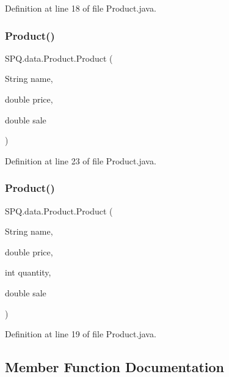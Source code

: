 Definition at line 18 of file Product.\+java.

\mbox{\label{class_s_p_q_1_1data_1_1_product_aeb77e341c092434872d42248d1c3af7d}} 
\subsubsection{\texorpdfstring{Product()}{Product()}\hspace{0.1cm}{\footnotesize\ttfamily [2/3]}}
{\footnotesize\ttfamily S\+P\+Q.\+data.\+Product.\+Product (\begin{DoxyParamCaption}\item[{String}]{name,  }\item[{double}]{price,  }\item[{double}]{sale }\end{DoxyParamCaption})}



Definition at line 23 of file Product.\+java.

\mbox{\label{class_s_p_q_1_1data_1_1_product_ada78ea5ee9ea14b1c94e930603e449cb}} 
\subsubsection{\texorpdfstring{Product()}{Product()}\hspace{0.1cm}{\footnotesize\ttfamily [3/3]}}
{\footnotesize\ttfamily S\+P\+Q.\+data.\+Product.\+Product (\begin{DoxyParamCaption}\item[{String}]{name,  }\item[{double}]{price,  }\item[{int}]{quantity,  }\item[{double}]{sale }\end{DoxyParamCaption})}



Definition at line 19 of file Product.\+java.



\subsection{Member Function Documentation}
\mbox{\label{class_s_p_q_1_1data_1_1_product_a03b62c19f01f4c231b742de9eba2ed25}} 
